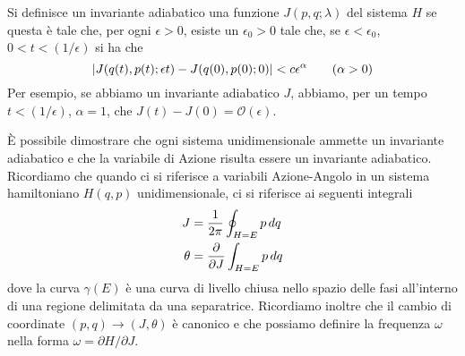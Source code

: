 \documentclass[10pt,a4paper]{article}
\begin{document}
Si definisce un invariante adiabatico una funzione \(J(p,q;\lambda)\) del sistema \(H\) se questa è tale che, per ogni \(\epsilon > 0\), esiste un \(\epsilon_0>0\) tale che, se \(\epsilon < \epsilon_0\), \(0<t<(1/\epsilon)\) si ha che
\begin{equation}
	\abs{J(q(t),p(t);\epsilon t) - J(q(0), p(0);0)}<c\epsilon^\alpha \quad\quad (\alpha > 0)
\end{equation}
Per esempio, se abbiamo un invariante adiabatico \(J\), abbiamo, per un tempo \(t<(1/\epsilon)\), \(\alpha=1\), che \(J(t)-J(0) = \mathcal{O}(\epsilon)\).

È possibile dimostrare che ogni sistema unidimensionale ammette un invariante adiabatico e che la variabile di Azione risulta essere un invariante adiabatico. Ricordiamo che quando ci si riferisce a variabili Azione-Angolo in un sistema hamiltoniano \(H(q,p)\) unidimensionale, ci si riferisce ai seguenti integrali
\begin{align}
	J &= \frac{1}{2\pi} \oint_{H=E} p\,dq \\
	\theta &= \pdv{}{J} \int_{H=E} p\,dq
\end{align}
dove la curva \(\gamma(E)\) è una curva di livello chiusa nello spazio delle fasi all'interno di una regione delimitata da una separatrice. Ricordiamo inoltre che il cambio di coordinate \((p,q)\to(J,\theta)\) è canonico e che possiamo definire la frequenza \(\omega\) nella forma \(\omega = \partial H / \partial J\).
\end{document}
